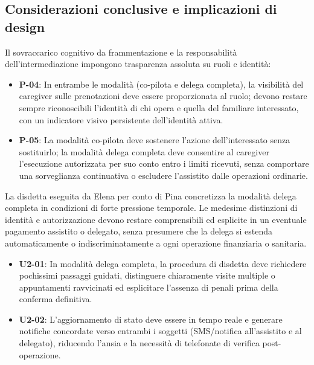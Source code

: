 \subsection[Implicazioni progettuali]{Considerazioni conclusive e implicazioni di design}
\vspace{-2pt}
Il sovraccarico cognitivo da frammentazione e la responsabilità dell'intermediazione impongono trasparenza assoluta su ruoli e identità:
\begin{itemize}[leftmargin=*,topsep=1pt,itemsep=0pt,parsep=0pt]
\item \hypertarget{req:P-04}{}\textbf{P-04}: In entrambe le modalità (co-pilota e delega completa), la visibilità del caregiver sulle prenotazioni deve essere proporzionata al ruolo; devono restare sempre riconoscibili l'identità di chi opera e quella del familiare interessato, con un indicatore visivo persistente dell'identità attiva.
\item \hypertarget{req:P-05}{}\textbf{P-05}: La modalità co-pilota deve sostenere l'azione dell'interessato senza sostituirlo; la modalità delega completa deve consentire al caregiver l'esecuzione autorizzata per suo conto entro i limiti ricevuti, senza comportare una sorveglianza continuativa o escludere l'assistito dalle operazioni ordinarie.
\end{itemize}

\vspace{-2pt}
La disdetta eseguita da Elena per conto di Pina concretizza la modalità delega completa in condizioni di forte pressione temporale. Le medesime distinzioni di identità e autorizzazione devono restare comprensibili ed esplicite in un eventuale pagamento assistito o delegato, senza presumere che la delega si estenda automaticamente o indiscriminatamente a ogni operazione finanziaria o sanitaria.
\begin{itemize}[leftmargin=*,topsep=1pt,itemsep=0pt,parsep=0pt]
\item \hypertarget{req:U2-01}{}\textbf{U2-01}: In modalità delega completa, la procedura di disdetta deve richiedere pochissimi passaggi guidati, distinguere chiaramente visite multiple o appuntamenti ravvicinati ed esplicitare l'assenza di penali prima della conferma definitiva.
\item \hypertarget{req:U2-02}{}\textbf{U2-02}: L'aggiornamento di stato deve essere in tempo reale e generare notifiche concordate verso entrambi i soggetti (SMS/notifica all'assistito e al delegato), riducendo l'ansia e la necessità di telefonate di verifica post-operazione.
\end{itemize}

